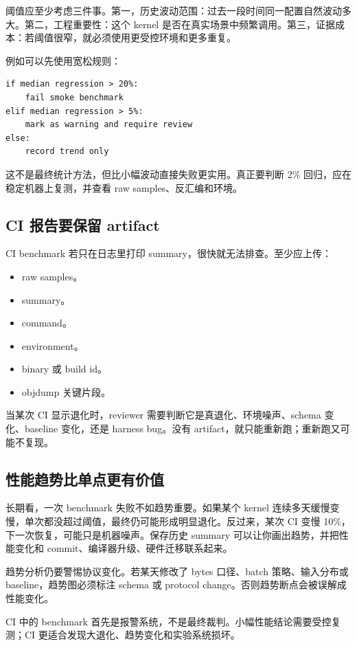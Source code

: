 阈值应至少考虑三件事。第一，历史波动范围：过去一段时间同一配置自然波动多大。第二，工程重要性：这个 kernel 是否在真实场景中频繁调用。第三，证据成本：若阈值很窄，就必须使用更受控环境和更多重复。

例如可以先使用宽松规则：

\begin{lstlisting}
if median regression > 20%:
    fail smoke benchmark
elif median regression > 5%:
    mark as warning and require review
else:
    record trend only
\end{lstlisting}

这不是最终统计方法，但比小幅波动直接失败更实用。真正要判断 2\% 回归，应在稳定机器上复测，并查看 raw samples、反汇编和环境。

\subsection{CI 报告要保留 artifact}

CI benchmark 若只在日志里打印 summary，很快就无法排查。至少应上传：

\begin{itemize}
  \item raw samples。
  \item summary。
  \item command。
  \item environment。
  \item binary 或 build id。
  \item objdump 关键片段。
\end{itemize}

当某次 CI 显示退化时，reviewer 需要判断它是真退化、环境噪声、schema 变化、baseline 变化，还是 harness bug。没有 artifact，就只能重新跑；重新跑又可能不复现。

\subsection{性能趋势比单点更有价值}

长期看，一次 benchmark 失败不如趋势重要。如果某个 kernel 连续多天缓慢变慢，单次都没超过阈值，最终仍可能形成明显退化。反过来，某次 CI 变慢 10\%，下一次恢复，可能只是机器噪声。保存历史 summary 可以让你画出趋势，并把性能变化和 commit、编译器升级、硬件迁移联系起来。

趋势分析仍要警惕协议变化。若某天修改了 bytes 口径、batch 策略、输入分布或 baseline，趋势图必须标注 schema 或 protocol change。否则趋势断点会被误解成性能变化。

\begin{keyidea}
CI 中的 benchmark 首先是报警系统，不是最终裁判。小幅性能结论需要受控复测；CI 更适合发现大退化、趋势变化和实验系统损坏。
\end{keyidea}

